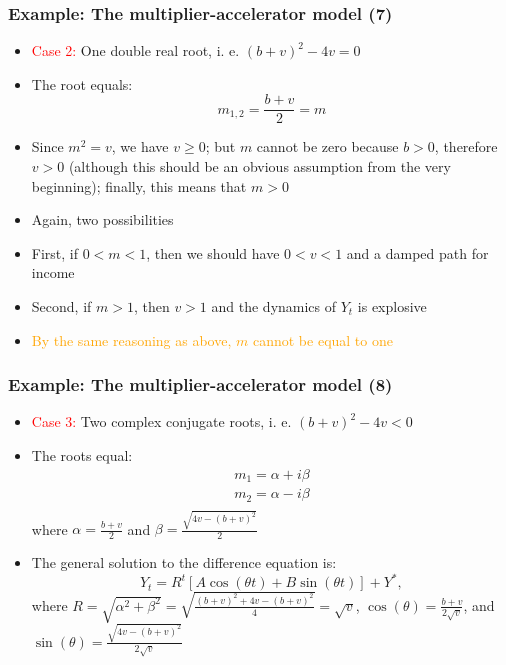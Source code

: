 \documentclass[10pt,usenames,dvipsnames]{beamer}
\theoremstyle{definition}
\begin{document}
\begin{frame}[fragile]
\frametitle{Example: The multiplier-accelerator model (7)}
\begin{itemize}
	\item \textcolor{red}{Case 2:} One double real root, i. e. $(b+v)^{2} - 4v = 0$
	\item The root equals:
	\[
		m_{1,2} = \frac{b + v}{2} = m
	\]
	\item Since $m^{2} = v$, we have $v \geq 0$; but $m$ cannot be zero because $b > 0$, therefore $v > 0$ (although this should be an obvious assumption from the very beginning); finally, this means that $m > 0$
	\item Again, two possibilities
	\item First, if $0 < m < 1$, then we should have $0 < v < 1$ and a damped path for income
	\item Second, if $m > 1$, then $v > 1$ and the dynamics of $Y_{t}$ is explosive
	\item \textcolor{orange}{By the same reasoning as above, $m$ cannot be equal to one} 
\end{itemize}
\end{frame}

\begin{frame}[fragile]
\frametitle{Example: The multiplier-accelerator model (8)}
\begin{itemize}
	\item \textcolor{red}{Case 3:} Two complex conjugate roots, i. e. $(b+v)^{2} - 4v < 0$
	\item The roots equal:
	\[
		\begin{array}{lcl}
			m_{1} = \alpha + i\beta\\
			m_{2} = \alpha - i\beta\\
		\end{array}
	\]
	where $\displaystyle \alpha = \frac{b+v}{2}$ and $\displaystyle \beta = \frac{\sqrt{4v - (b + v)^{2}}}{2}$
	\item The general  solution to the difference equation is:
	\[
		Y_{t} = R^{t}[A\cos(\theta t) + B\sin(\theta t)] + Y^{*},
	\]
	where $\displaystyle R = \sqrt{\alpha^{2} + \beta^{2}} = \sqrt{\frac{(b + v)^{2} + 4v - (b + v)^{2}}{4}} = \sqrt{v}$, $\displaystyle \cos(\theta) = \frac{b + v}{2\sqrt{v}}$, and $\displaystyle \sin(\theta) = \frac{\sqrt{4v - (b + v)^{2}}}{2\sqrt{v}}$
\end{itemize}
\end{frame}
\end{document}
